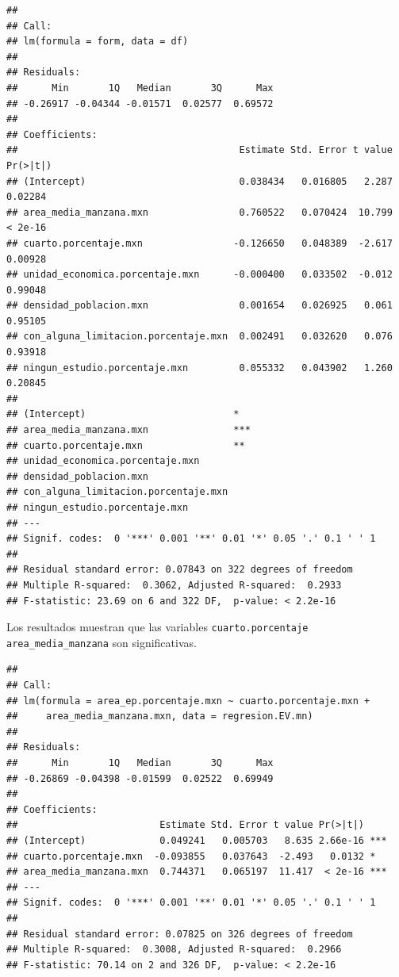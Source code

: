 \documentclass[12pt,]{book}
\begin{document}
\begin{verbatim}
## 
## Call:
## lm(formula = form, data = df)
## 
## Residuals:
##      Min       1Q   Median       3Q      Max 
## -0.26917 -0.04344 -0.01571  0.02577  0.69572 
## 
## Coefficients:
##                                       Estimate Std. Error t value Pr(>|t|)
## (Intercept)                           0.038434   0.016805   2.287  0.02284
## area_media_manzana.mxn                0.760522   0.070424  10.799  < 2e-16
## cuarto.porcentaje.mxn                -0.126650   0.048389  -2.617  0.00928
## unidad_economica.porcentaje.mxn      -0.000400   0.033502  -0.012  0.99048
## densidad_poblacion.mxn                0.001654   0.026925   0.061  0.95105
## con_alguna_limitacion.porcentaje.mxn  0.002491   0.032620   0.076  0.93918
## ningun_estudio.porcentaje.mxn         0.055332   0.043902   1.260  0.20845
##                                         
## (Intercept)                          *  
## area_media_manzana.mxn               ***
## cuarto.porcentaje.mxn                ** 
## unidad_economica.porcentaje.mxn         
## densidad_poblacion.mxn                  
## con_alguna_limitacion.porcentaje.mxn    
## ningun_estudio.porcentaje.mxn           
## ---
## Signif. codes:  0 '***' 0.001 '**' 0.01 '*' 0.05 '.' 0.1 ' ' 1
## 
## Residual standard error: 0.07843 on 322 degrees of freedom
## Multiple R-squared:  0.3062, Adjusted R-squared:  0.2933 
## F-statistic: 23.69 on 6 and 322 DF,  p-value: < 2.2e-16
\end{verbatim}

Los resultados muestran que las variables \texttt{cuarto.porcentaje}
\texttt{area\_media\_manzana} son significativas.

\begin{verbatim}
## 
## Call:
## lm(formula = area_ep.porcentaje.mxn ~ cuarto.porcentaje.mxn + 
##     area_media_manzana.mxn, data = regresion.EV.mn)
## 
## Residuals:
##      Min       1Q   Median       3Q      Max 
## -0.26869 -0.04398 -0.01599  0.02522  0.69949 
## 
## Coefficients:
##                         Estimate Std. Error t value Pr(>|t|)    
## (Intercept)             0.049241   0.005703   8.635 2.66e-16 ***
## cuarto.porcentaje.mxn  -0.093855   0.037643  -2.493   0.0132 *  
## area_media_manzana.mxn  0.744371   0.065197  11.417  < 2e-16 ***
## ---
## Signif. codes:  0 '***' 0.001 '**' 0.01 '*' 0.05 '.' 0.1 ' ' 1
## 
## Residual standard error: 0.07825 on 326 degrees of freedom
## Multiple R-squared:  0.3008, Adjusted R-squared:  0.2966 
## F-statistic: 70.14 on 2 and 326 DF,  p-value: < 2.2e-16
\end{verbatim}
\end{document}
